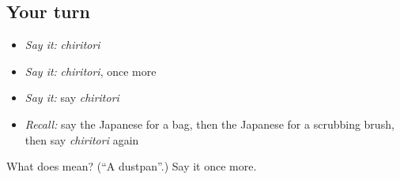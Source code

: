 \subsection*{Your turn}
\begin{itemize}
\raggedright
  \item \emph{Say it:} \emph{chiritori}
  \item \emph{Say it:} \emph{chiritori}, once more
  \item \emph{Say it:} say \emph{chiritori}
  \item \emph{Recall:} say the Japanese for a bag, then the Japanese for a scrubbing brush, then say \emph{chiritori} again
\end{itemize}

\begin{tcolorbox}[breakable,colback=teal!4,colframe=teal!35!black,title={Before you move on}]
What does  mean? (\textquotedblleft{}A dustpan\textquotedblright{}.) Say it once more.
\end{tcolorbox}
